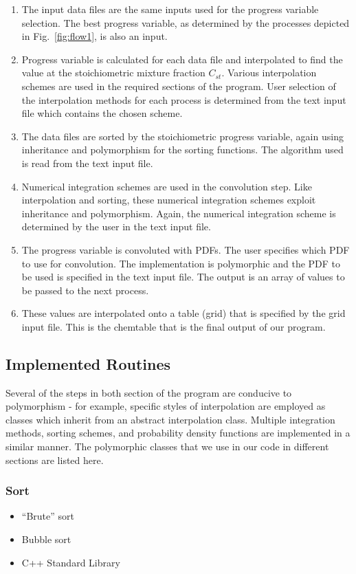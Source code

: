 \documentclass[11pt]{article}
\begin{document}
\begin{enumerate}
\item The input data files are the same inputs used for the progress variable selection. The best progress variable, as determined by the processes depicted in Fig.~\ref{fig:flow1}, is also an input.  
\item Progress variable is calculated for each data file and interpolated to find the value at the stoichiometric mixture fraction $C_{st}$. Various interpolation schemes are used in the required sections of the program. User selection of the interpolation methods for each process is determined from the text input file which contains the chosen scheme.
\item The data files are sorted by the stoichiometric progress variable, again using inheritance and polymorphism for the sorting functions. The algorithm used is read from the text input file.
\item Numerical integration schemes are used in the convolution step.  Like interpolation and sorting, these numerical integration schemes exploit inheritance and polymorphism. Again, the numerical integration scheme is determined by the user in the text input file.
\item The progress variable is convoluted with PDFs. The user specifies which PDF to use for convolution.  The implementation is polymorphic and the PDF to be used is specified in the text input file.  The output is an array of values to be passed to the next process.
\item These values are interpolated onto a table (grid) that is specified by the grid input file.  This is the chemtable that is the final output of our program.  
\end{enumerate}

\subsection{Implemented Routines}
Several of the steps in both section of the program are conducive to polymorphism - for example, specific styles of interpolation are employed as classes which inherit from an abstract interpolation class. Multiple integration methods, sorting schemes, and probability density functions are implemented in a similar manner. The polymorphic classes that we use in our code in different sections are listed here. 

\subsubsection{Sort}
\begin{itemize}
\item “Brute” sort 
\item Bubble sort
\item C++ Standard Library
\end{itemize}
\end{document}
